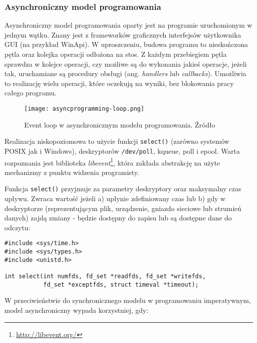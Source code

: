 \subsubsection{Asynchroniczny model programowania}
\label{subsub:asyncprogramming}

Asynchroniczny model programowania oparty jest na programie uruchomionym w jednym wątku. Znany jest z frameworków graficznych interfejsów użytkownika GUI (na przykład WinApi). W uproszczeniu, budowa programu to nieskończona pętla oraz kolejka operacji odłożona na stos. Z każdym przebiegiem pętla sprawdza w kolejce operacji, czy możliwe są do wykonania jakieś operacje, jeżeli tak, uruchamiane są procedury obsługi (ang. \emph{handlers} lub \emph{callbacks}). Umożliwia to realizację wielu operacji, które oczekują na wyniki, bez blokowania pracy całego programu.

\begin{figure}[H]
  \centering
    \texttt{[image: asyncprogramming-loop.png]}
  \caption[Event loop w asynchronicznym modelu programowania]{Event loop w asynchronicznym modelu programowania. Źródło \cite{async-servers}}
\end{figure}

Realizacja niskopoziomowa to użycie funkcji \lstinline{select()} (zarówno systemów POSIX jak i Windows), deskryptorów \lstinline{/dev/poll}, kqueue, poll i epool. Warta rozpoznania jest biblioteka \emph{libevent}\footnote{\url{http://libevent.org/}}, która zakłada abstrakcję na użyte mechanizmy z punktu widzenia programisty\cite{programming-async-sockets}.

Funkcja \lstinline{select()} przyjmuje za parametry deskryptory oraz maksymalny czas upływu. Zwraca wartość jeżeli a) upłynie zdefiniowany czas lub b) gdy w deskryptorze (reprezentującym plik, urządzenie, gniazdo sieciowe lub strumień danych) zajdą zmiany - będzie dostępny do zapisu lub są dostępne dane do odczytu:

\lstset{language=C}
\begin{lstlisting}
#include <sys/time.h>
#include <sys/types.h>
#include <unistd.h>

int select(int numfds, fd_set *readfds, fd_set *writefds,
           fd_set *exceptfds, struct timeval *timeout);
\end{lstlisting}

W przeciwieństwie do synchronicznego modelu w programowaniu imperatywnym, model asynchroniczny wypada korzystniej, gdy\cite{programming-async}:

